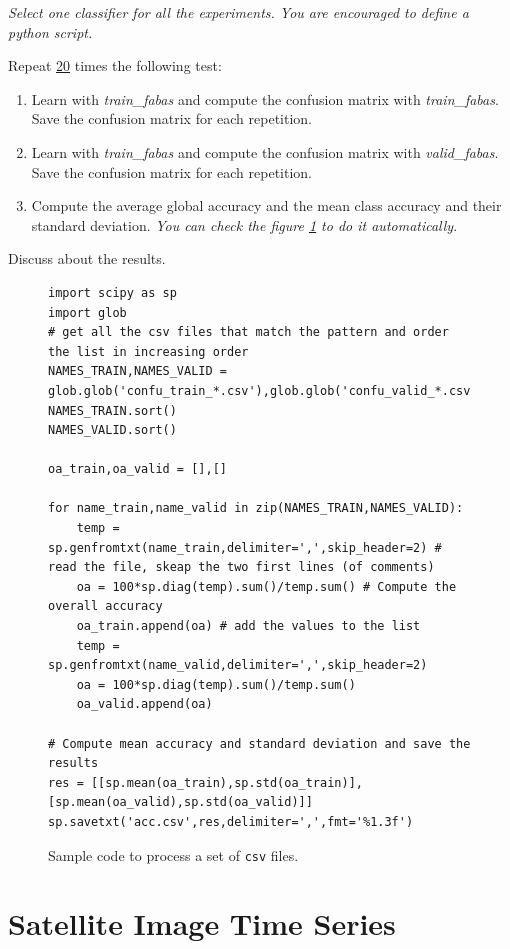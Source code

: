 \documentclass[a4paper,11pt,DIV=18]{scrartcl}
\begin{document}
\emph{Select one classifier  for all the experiments. You  are encouraged to
define a python script.}

\begin{work}
Repeat \uline{20} times the following test:
\begin{enumerate}
\item Learn with \emph{train\_fabas} and compute the confusion matrix with
\emph{train\_fabas}. Save the confusion matrix for each repetition.
\item Learn  with  \emph{train\_fabas}  and compute  the  confusion  matrix  with
\emph{valid\_fabas}. Save the confusion matrix for each repetition.
\item Compute the average global accuracy and the mean class accuracy and
their standard deviation. \emph{You can check the figure \ref{orgc86218b} to do it automatically}.
\end{enumerate}


Discuss about the results. 
\end{work}

\begin{figure}
\begin{verbatim}
import scipy as sp
import glob
# get all the csv files that match the pattern and order the list in increasing order
NAMES_TRAIN,NAMES_VALID = glob.glob('confu_train_*.csv'),glob.glob('confu_valid_*.csv')
NAMES_TRAIN.sort()
NAMES_VALID.sort()

oa_train,oa_valid = [],[]

for name_train,name_valid in zip(NAMES_TRAIN,NAMES_VALID):
    temp = sp.genfromtxt(name_train,delimiter=',',skip_header=2) # read the file, skeap the two first lines (of comments)
    oa = 100*sp.diag(temp).sum()/temp.sum() # Compute the overall accuracy
    oa_train.append(oa) # add the values to the list
    temp = sp.genfromtxt(name_valid,delimiter=',',skip_header=2)
    oa = 100*sp.diag(temp).sum()/temp.sum()
    oa_valid.append(oa)
    
# Compute mean accuracy and standard deviation and save the results
res = [[sp.mean(oa_train),sp.std(oa_train)],[sp.mean(oa_valid),sp.std(oa_valid)]]
sp.savetxt('acc.csv',res,delimiter=',',fmt='%1.3f')
\end{verbatim}
\caption{\label{orgc86218b}
Sample code to process a set of \texttt{csv} files.}
\end{figure}
\section{Satellite Image Time Series}
\label{sec:org3a595fa}
\end{document}
